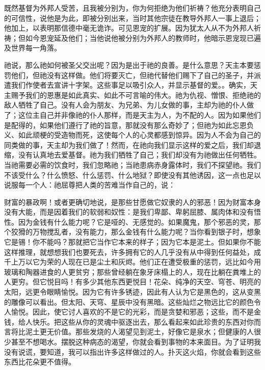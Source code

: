 既然基督为外邦人受苦，且我被分别为，你为何拒绝为他们祈祷？他充分表明自己的可信性，说他是为此，即被分别出来，当时其他宗徒在教导外邦人一事上退后；他加上，以表明那信德中毫无诡诈。可见恩宠的扩展。因为犹太人从不为外邦人祈祷；但如今恩宠延及他们；当他说他被分别为外邦人的教师时，他暗示恩宠现已遍及世界每一角落。\par

祂说，那么祂如何被圣父交出呢？因为是出于祂的良善。是什么意思？天主本要惩罚他们，但祂没有这样做。他们将要灭亡，但祂代替他们赐下了自己的圣子，并派遣我们作使者去宣讲十字架。这些事足以吸引众人，并显示基督的爱。。确实，天主赐予我们的恩惠是如此真实、如此不可言喻的伟大。祂为仇视、憎恨、拒绝祂的敌人牺牲了自己。没有人会为朋友、为兄弟、为儿女做的事，主却为祂的仆人做了；这位主自己并非像祂的仆人那样，而是天主为人，为不配的人。因为如果他们是配得的，如果他们遵行了祂的旨意，那就没有那么奇妙了；但祂为如此忘恩负义、如此顽梗的受造物而死，这使每个人的心灵都感到惊异。因为人不会为自己的同类做的事，天主却为我们做了！然而，在祂向我们显示这样的爱之后，我们却退缩，没有认真地去爱基督。祂为我们牺牲了自己；我们却没有为祂做出任何牺牲。当祂需要必需的饮食时，我们忽略祂；当祂患病赤身露体时，我们不探望祂。我们不该受什么？什么愤怒、什么惩罚、什么地狱？即使没有其他诱因，这一点也足以说服每一个人：祂屈尊把人类的苦难当作自己的，说：\par

财富的暴政啊！或者更确切地说，是那些甘愿做它奴隶的人的邪恶！因为财富本身没有大能，而是因着我们的软弱和奴性：是我们卑鄙、卑躬屈膝、属肉体和没有悟性。因为金钱有什么能力呢？它是哑的、无感觉的。如果魔鬼，那个邪恶的灵，那个狡猾的万物搅乱者，没有能力，那么金钱有什么能力呢？当你看到银子时，想象它是锡！你不能吗？那就把它当作它本来的样子；因为它本是泥土。但如果你不能这样推理，就想想我们也要死去，许多拥有它的人几乎没有从中得到任何益处，成千上万以它为荣的人现在已是尘土和灰烬。他们正在遭受极重的惩罚，远比如今用玻璃和陶器进食的人更贫穷；那些曾经躺在象牙床榻上的人，现在比躺在粪堆上的人更穷。但它悦目吗！有多少其他东西更悦目！花朵、纯净的天空、穹苍、明亮的太阳，远更令眼睛愉悦。因为它有许多锈迹，因此有人认为它是黑色的，这从变黑的雕像可以看出。但太阳、天穹、星辰中没有黑暗。这些灿烂之物远比它的颜色令人愉悦。因此，使它讨人喜欢的不是它的光彩，而是贪婪和邪恶；这些，而不是金钱，给人快乐。把这些从你的灵魂中驱逐出去，那么看起来如此珍贵的东西对你而言将比泥土更无价值。那些发烧的人渴望见到泥土，好像它是泉水；但健康的人很少甚至不想喝水。摆脱这种病态的渴望，你就会看到事物的本来面目。为了证明我没有说谎，要知道，我可以指出许多这样做过的人。扑灭这火焰，你就会看到这些东西比花朵更不值得。\par

